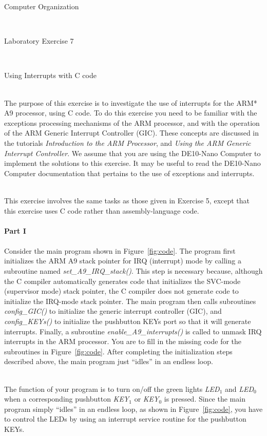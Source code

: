 \documentclass[epsfig,10pt,fullpage]{article}
\newcommand{\LabNum}{7}
\begin{document}
\centerline{\huge Computer Organization}
~\\
\centerline{\huge Laboratory Exercise \LabNum}
~\\
\centerline{\large Using Interrupts with C code}
~\\

\noindent
The purpose of this exercise is to investigate the use of interrupts for the ARM* A9
processor, using C code. To do this exercise you need to be familiar with
the exceptions processing mechanisms of the ARM processor, and with the operation of
the ARM Generic Interrupt Controller (GIC). These concepts are discussed in the tutorials 
{\it Introduction to the ARM Processor}, and {\it Using the ARM Generic Interrupt
Controller}.  We assume that you are using the DE10-Nano Computer to implement the
solutions to this exercise. It may be useful to read the DE10-Nano Computer documentation that
pertains to the use of exceptions and interrupts.

~\\
\noindent
This exercise involves the same tasks as those given in Exercise 5,
except that this exercise uses C code rather than assembly-language code.
~\\
~\\
\noindent
{\bf Part I}
~\\
~\\
\noindent
Consider the main program shown in Figure~\ref{fig:code}. The program first initializes the
ARM A9 stack pointer for IRQ (interrupt) mode by calling a subroutine named
{\it set\_A9\_IRQ\_stack()}. This step is necessary because, although
the C compiler automatically generates code that initializes the SVC-mode (supervisor mode)
stack pointer, the C compiler does not generate code to initialize the IRQ-mode stack pointer.
The main program then calls subroutines {\it config\_GIC()} to initialize the generic 
interrupt controller (GIC), and {\it config\_KEYs()} to initialize the pushbutton KEYs 
port so that it will generate interrupts. 
Finally, a subroutine {\it enable\_A9\_interrupts()} is called to unmask
IRQ interrupts in the ARM processor. You are to fill in the missing code for the 
subroutines in Figure~\ref{fig:code}. After completing the initialization steps
described above, the main program just ``idles'' in an endless loop.

~\\
\noindent
The function of your program is to turn on/off the green lights {\it LED}$_1$ and {\it LED}$_0$
when a corresponding pushbutton {\it KEY}$_1$ or {\it KEY}$_0$ is pressed. 
Since the main program simply ``idles'' in an endless loop, as
shown in Figure~\ref{fig:code}, you have to control the LEDs by using an 
interrupt service routine for the pushbutton KEYs. 
\end{document}
